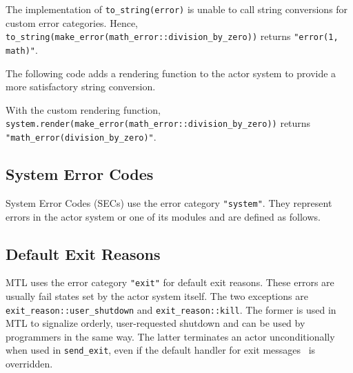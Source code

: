 
The implementation of \lstinline^to_string(error)^ is unable to call string
conversions for custom error categories. Hence,
\lstinline^to_string(make_error(math_error::division_by_zero))^ returns
\lstinline^"error(1, math)"^.

The following code adds a rendering function to the actor system to provide a
more satisfactory string conversion.


With the custom rendering function,
\lstinline^system.render(make_error(math_error::division_by_zero))^ returns
\lstinline^"math_error(division_by_zero)"^.

\clearpage
\subsection{System Error Codes}
\label{sec}

System Error Codes (SECs) use the error category \lstinline^"system"^. They
represent errors in the actor system or one of its modules and are defined as
follows.


\subsection{Default Exit Reasons}
\label{exit-reason}

MTL uses the error category \lstinline^"exit"^ for default exit reasons. These
errors are usually fail states set by the actor system itself. The two
exceptions are \lstinline^exit_reason::user_shutdown^ and
\lstinline^exit_reason::kill^. The former is used in MTL to signalize orderly,
user-requested shutdown and can be used by programmers in the same way. The
latter terminates an actor unconditionally when used in \lstinline^send_exit^,
even if the default handler for exit messages~ is overridden.

